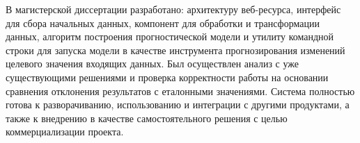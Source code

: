 В магистерской диссертации разработано: архитектуру веб-ресурса, интерфейс для сбора начальных данных, компонент для обработки и трансформации данных, алгоритм построения прогностической модели и утилиту командной строки для запуска модели в качестве инструмента прогнозирования изменений целевого значения входящих данных. Был осуществлен анализ с уже существующими решениями и проверка корректности работы на основании сравнения отклонения результатов с еталонными значениями. Система полностью готова к разворачиванию, использованию и интеграции с другими продуктами, а также к внедрению в качестве самостоятельного решения с целью коммерциализации проекта.
